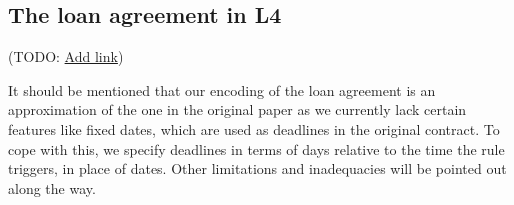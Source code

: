 \documentclass{article}
\begin{document}









\subsection{The loan agreement in L4}
(TODO:
\href{
  https://docs.google.com/spreadsheets/d/1_k17mzk2hTyPY2egbEVqXzr8uYAdi6BVqeMYdBxKB_I/edit#gid=864296175
}{Add link})

It should be mentioned that our encoding of the loan agreement is an
approximation of the
one in the original paper \cite{contract_as_automaton} as we currently lack
certain features like fixed dates, which are used as deadlines in the original
contract.
To cope with this, we specify deadlines in terms of days relative to the
time the rule triggers, in place of dates.
Other limitations and inadequacies will be pointed out along the way.
\end{document}
